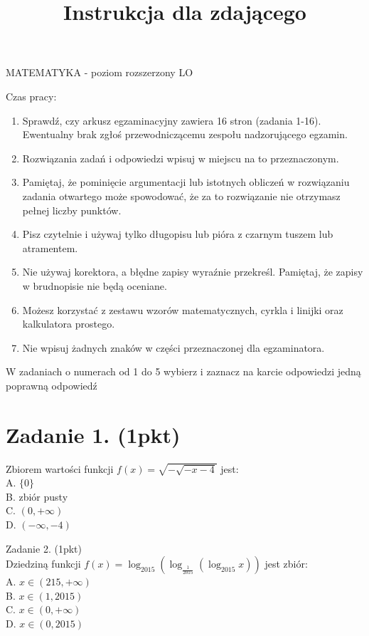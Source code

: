 \documentclass[10pt]{article}
\title{Instrukcja dla zdającego }
\author{}
\date{}
\begin{document}
\maketitle
MATEMATYKA - poziom rozszerzony LO

Czas pracy:

\begin{enumerate}
  \item Sprawdź, czy arkusz egzaminacyjny zawiera 16 stron (zadania 1-16). Ewentualny brak zgłoś przewodniczącemu zespołu nadzorującego egzamin.
  \item Rozwiązania zadań i odpowiedzi wpisuj w miejscu na to przeznaczonym.
  \item Pamiętaj, że pominięcie argumentacji lub istotnych obliczeń w rozwiązaniu zadania otwartego może spowodować, że za to rozwiązanie nie otrzymasz pełnej liczby punktów.
  \item Pisz czytelnie i używaj tylko długopisu lub pióra z czarnym tuszem lub atramentem.
  \item Nie używaj korektora, a błędne zapisy wyraźnie przekreśl. Pamiętaj, że zapisy w brudnopisie nie będą oceniane.
  \item Możesz korzystać z zestawu wzorów matematycznych, cyrkla i linijki oraz kalkulatora prostego.
  \item Nie wpisuj żadnych znaków w części przeznaczonej dla egzaminatora.
\end{enumerate}

W zadaniach o numerach od 1 do 5 wybierz i zaznacz na karcie odpowiedzi jedną poprawną odpowiedź

\section*{Zadanie 1. (1pkt)}
Zbiorem wartości funkcji \(f(x)=\sqrt{-\sqrt{-x-4}}\) jest:\\
A. \(\{0\}\)\\
B. zbiór pusty\\
C. \((0,+\infty)\)\\
D. \((-\infty,-4)\)

Zadanie 2. (1pkt)\\
Dziedziną funkcji \(f(x)=\log _{2015}\left(\log _{\frac{1}{2015}}\left(\log _{2015} x\right)\right)\) jest zbiór:\\
A. \(x \in(215,+\infty)\)\\
B. \(x \in(1,2015)\)\\
C. \(x \in(0,+\infty)\)\\
D. \(x \in(0,2015)\)
\end{document}
